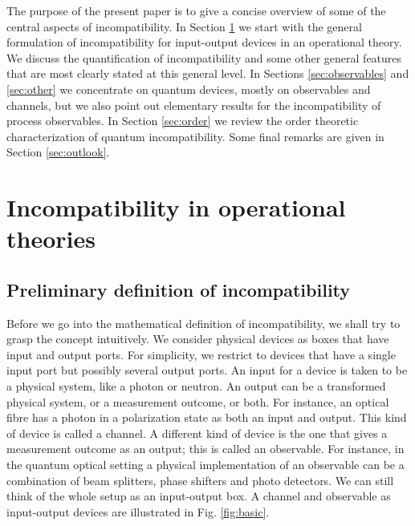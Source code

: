 \documentclass[12pt]{iopart}
\theoremstyle{definition}
\begin{document}
The purpose of the present paper is to give a concise overview of some of the central aspects of incompatibility. In Section \ref{sec:incompatibility} we start with the general formulation of incompatibility for input-output devices in an operational theory. We discuss the quantification of incompatibility and some other general features that are most clearly stated at this general level. In Sections \ref{sec:observables} and \ref{sec:other} we concentrate on quantum devices, mostly on observables and channels, but we also point out elementary results for the incompatibility of process observables. 
In Section \ref{sec:order} we review the order theoretic characterization of quantum incompatibility.
Some final remarks are given in Section \ref{sec:outlook}.

\section{Incompatibility in operational theories}\label{sec:incompatibility}

\subsection{Preliminary definition of incompatibility}\label{sec:prelim}

Before we go into the mathematical definition of incompatibility, we shall try to grasp the concept intuitively.
We consider physical devices as boxes that have input and output ports.
For simplicity, we restrict to devices that have a single input port but possibly several output ports.  
An input for a device is taken to be a physical system, like a photon or neutron.
An output can be a transformed physical system, or a measurement outcome, or both.
For instance, an optical fibre has a photon in a polarization state as both an input and output.
This kind of device is called a channel.
A different kind of device is the one that gives a measurement outcome as an output; this is called an observable. 
For instance, in the quantum optical setting a physical implementation of an observable can be a combination of beam splitters, phase shifters and photo detectors.
We can still think of the whole setup as an input-output box. 
A channel and observable as input-output devices are illustrated in Fig. \ref{fig:basic}.
\end{document}
